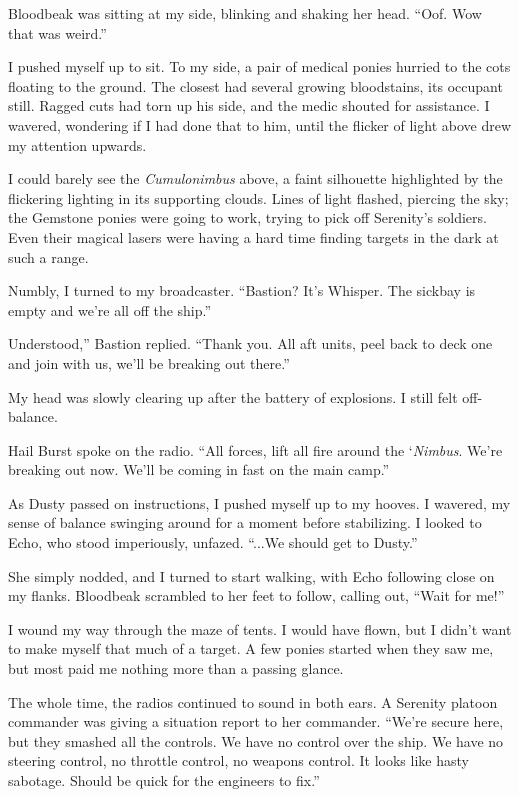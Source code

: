 Bloodbeak was sitting at my side, blinking and shaking her head. “Oof. Wow that was weird.”

I pushed myself up to sit. To my side, a pair of medical ponies hurried to the cots floating to the ground. The closest had several growing bloodstains, its occupant still. Ragged cuts had torn up his side, and the medic shouted for assistance. I wavered, wondering if I had done that to him, until the flicker of light above drew my attention upwards.

I could barely see the \textit{Cumulonimbus} above, a faint silhouette highlighted by the flickering lighting in its supporting clouds. Lines of light flashed, piercing the sky; the Gemstone ponies were going to work, trying to pick off Serenity’s soldiers. Even their magical lasers were having a hard time finding targets in the dark at such a range.

Numbly, I turned to my broadcaster. “Bastion? It’s Whisper. The sickbay is empty and we’re all off the ship.”

\leavevmode{}Understood,” Bastion replied. “Thank you. All aft units, peel back to deck one and join with us, we’ll be breaking out there.”

My head was slowly clearing up after the battery of explosions. I still felt off-balance.

Hail Burst spoke on the radio. “All forces, lift all fire around the ‘\textit{Nimbus}. We’re breaking out now. We’ll be coming in fast on the main camp.”

As Dusty passed on instructions, I pushed myself up to my hooves. I wavered, my sense of balance swinging around for a moment before stabilizing. I looked to Echo, who stood imperiously, unfazed. “...We should get to Dusty.”

She simply nodded, and I turned to start walking, with Echo following close on my flanks. Bloodbeak scrambled to her feet to follow, calling out, “Wait for me!”

I wound my way through the maze of tents. I would have flown, but I didn’t want to make myself that much of a target. A few ponies started when they saw me, but most paid me nothing more than a passing glance.

The whole time, the radios continued to sound in both ears. A Serenity platoon commander was giving a situation report to her commander. “We’re secure here, but they smashed all the controls. We have no control over the ship. We have no steering control, no throttle control, no weapons control. It looks like hasty sabotage. Should be quick for the engineers to fix.”

